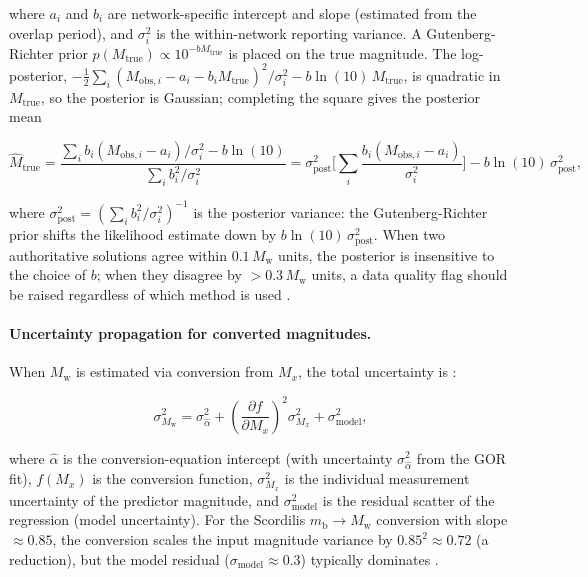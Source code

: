 \documentclass[12pt]{article}
\begin{document}
where $a_i$ and $b_i$ are network-specific intercept and slope (estimated from
the overlap period), and $\sigma_i^2$ is the within-network reporting variance.
A Gutenberg-Richter prior $p(M_\mathrm{true}) \propto 10^{-b M_\mathrm{true}}$
is placed on the true magnitude.  The log-posterior,
$-\tfrac{1}{2}\sum_i (M_{\mathrm{obs},i} - a_i - b_i M_\mathrm{true})^2/\sigma_i^2
- b \ln(10)\, M_\mathrm{true}$, is quadratic in $M_\mathrm{true}$, so the
posterior is Gaussian; completing the square gives the posterior mean

\begin{equation}
  \hat{M}_\mathrm{true} = \frac{
    \sum_i b_i (M_{\mathrm{obs},i} - a_i)/\sigma_i^2
    - b \ln(10)
  }{
    \sum_i b_i^2/\sigma_i^2
  }
  = \sigma_\mathrm{post}^2 \Big[ \sum_i \frac{b_i (M_{\mathrm{obs},i} - a_i)}{\sigma_i^2} \Big]
    - b \ln(10)\, \sigma_\mathrm{post}^2,
  \label{eq:bayesposterior}
\end{equation}

where $\sigma_\mathrm{post}^2 = (\sum_i b_i^2/\sigma_i^2)^{-1}$ is the
posterior variance: the Gutenberg-Richter prior shifts the likelihood estimate
down by $b \ln(10)\,\sigma_\mathrm{post}^2$.  When two authoritative solutions agree within
$0.1\,M_\mathrm{w}$ units, the posterior is insensitive to the choice of $b$;
when they disagree by $> 0.3\,M_\mathrm{w}$ units, a data quality flag should
be raised regardless of which method is used \citep{Si2024}.

\paragraph{Uncertainty propagation for converted magnitudes.}
When $M_\mathrm{w}$ is estimated via conversion from $M_x$, the total
uncertainty is \citep{DeadSea2022, Grunthal2016}:

\begin{equation}
  \sigma_{M_\mathrm{w}}^2 = \sigma_{\hat{\alpha}}^2
    + \left(\frac{\partial f}{\partial M_x}\right)^2 \sigma_{M_x}^2
    + \sigma_{\mathrm{model}}^2,
  \label{eq:uncert}
\end{equation}

where $\hat{\alpha}$ is the conversion-equation intercept (with uncertainty
$\sigma_{\hat{\alpha}}^2$ from the GOR fit), $f(M_x)$ is the conversion
function, $\sigma_{M_x}^2$ is the individual measurement uncertainty of the
predictor magnitude, and $\sigma_{\mathrm{model}}^2$ is the residual scatter
of the regression (model uncertainty).  For the Scordilis
$m_\mathrm{b} \to M_\mathrm{w}$ conversion with slope $\approx 0.85$, the
conversion scales the input magnitude variance by $0.85^2 \approx 0.72$
(a reduction), but the model residual ($\sigma_{\mathrm{model}} \approx 0.3$)
typically dominates \citep{Scordilis2006, Grunthal2016}.
\end{document}
